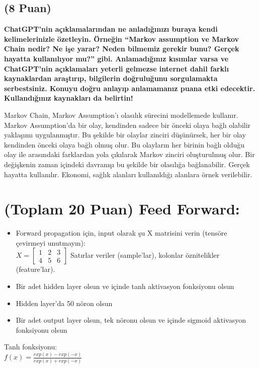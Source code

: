 \documentclass[11pt]{article}
\begin{document}
\subsection{(8 Puan)} \textbf{ChatGPT’nin açıklamalarından ne anladığınızı buraya kendi kelimelerinizle özetleyin. Örneğin ``Markov assumption ve Markov Chain nedir? Ne işe yarar? Neden bilmemiz gerekir bunu? Gerçek hayatta kullanılıyor mu?'' gibi. Anlamadığınız kısımlar varsa ve ChatGPT’nin açıklamaları yeterli gelmezse internet dahil farklı kaynaklardan araştırıp, bilgilerin doğruluğunu sorgulamakta serbestsiniz. Konuyu doğru anlayıp anlamamanız puana etki edecektir. Kullandığınız kaynakları da belirtin!}

Markov Chain, Markov Assumption'ı olasılık sürecini modellemede kullanır. Markov Assumption'da bir olay, kendinden sadece bir önceki olaya bağlı olabilir yaklaşımı uygulanmıştır. Bu şekilde bir olaylar zinciri düşünürsek, her bir olay kendinden önceki olaya bağlı olmuş olur. Bu olayların her birinin bağlı olduğu olay ile arasındaki farklardan yola çıkılarak Markov zinciri oluşturulmuş olur. Bir değişkenin zaman içindeki davranışı bu şekilde bir olasılığa bağlanabilir. Gerçek hayatta kullanılır. Ekonomi, sağlık alanları kullanıldığı alanlara örnek verilebilir.

\section{(Toplam 20 Puan) Feed Forward:}
 
\begin{itemize}
    \item Forward propagation için, input olarak şu X matrisini verin (tensöre çevirmeyi unutmayın):\\
    $X = \begin{bmatrix}
        1 & 2 & 3\\
        4 & 5 & 6
        \end{bmatrix}$
    Satırlar veriler (sample'lar), kolonlar öznitelikler (feature'lar).
    \item Bir adet hidden layer olsun ve içinde tanh aktivasyon fonksiyonu olsun
    \item Hidden layer'da 50 nöron olsun
    \item Bir adet output layer olsun, tek nöronu olsun ve içinde sigmoid aktivasyon fonksiyonu olsun
\end{itemize}

Tanh fonksiyonu:\\
$f(x) = \frac{exp(x) - exp(-x)}{exp(x) + exp(-x)}$
\vspace{.2in}
\end{document}
